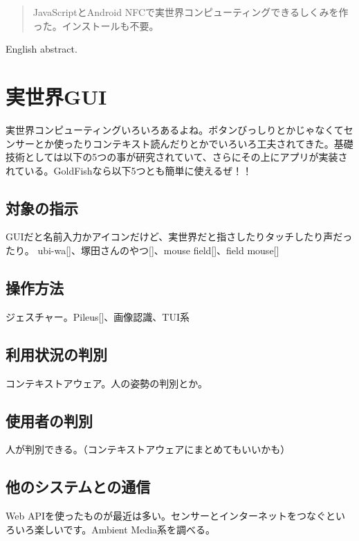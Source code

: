 
\begin{abstract}
JavaScriptとAndroid NFCで実世界コンピューティングできるしくみを作った。インストールも不要。
\end{abstract}

\begin{eabstract}
English abstract.
\end{eabstract}

\maketitle

\section{実世界GUI}\label{sec:Introduction}
実世界コンピューティングいろいろあるよね。ボタンびっしりとかじゃなくてセンサーとか使ったりコンテキスト読んだりとかでいろいろ工夫されてきた。基礎技術としては以下の5つの事が研究されていて、さらにその上にアプリが実装されている。GoldFishなら以下5つとも簡単に使えるぜ！！

\subsection{対象の指示}
GUIだと名前入力かアイコンだけど、実世界だと指さしたりタッチしたり声だったり。
ubi-wa[]、塚田さんのやつ[]、mouse field[]、field mouse[]

\subsection{操作方法}
ジェスチャー。Pileus[]、画像認識、TUI系

\subsection{利用状況の判別}
コンテキストアウェア。人の姿勢の判別とか。

\subsection{使用者の判別}
人が判別できる。（コンテキストアウェアにまとめてもいいかも）

\subsection{他のシステムとの通信}
Web APIを使ったものが最近は多い。センサーとインターネットをつなぐといろいろ楽しいです。Ambient Media系を調べる。

